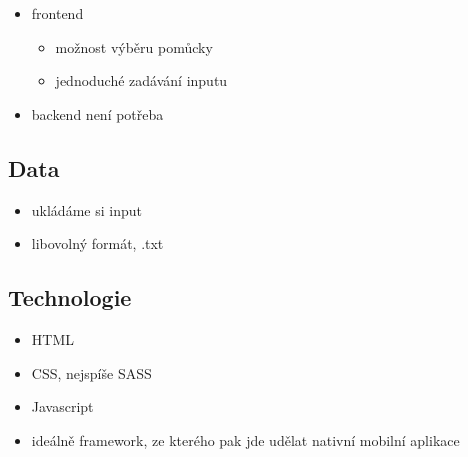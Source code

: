 \documentclass{article}
\begin{document}
\begin{itemize}
    \item frontend
        \begin{itemize}
            \item možnost výběru pomůcky
            \item jednoduché zadávání inputu
        \end{itemize}
    \item backend není potřeba
\end{itemize}

\subsection{Data}

\begin{itemize}
    \item ukládáme si input
    \item libovolný formát, .txt
\end{itemize}

\subsection{Technologie}

\begin{itemize}
    \item HTML
    \item CSS, nejspíše SASS
    \item Javascript
    \item ideálně framework, ze kterého pak jde udělat nativní mobilní aplikace
\end{itemize}
\end{document}
